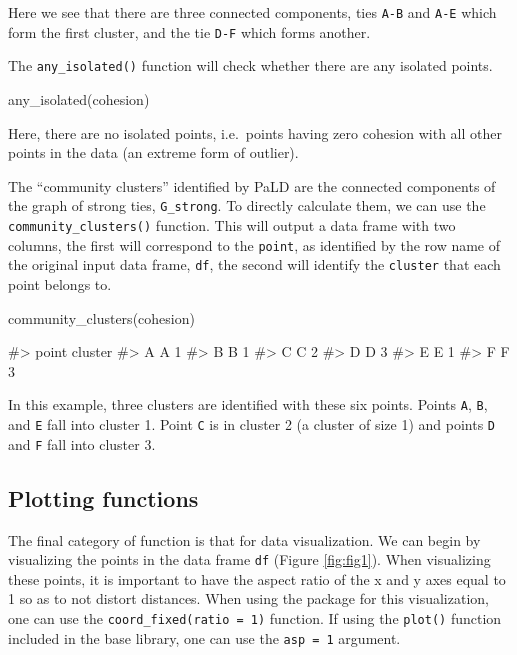 Here we see that there are three connected components, ties \texttt{A-B}
and \texttt{A-E} which form the first cluster, and the tie \texttt{D-F}
which forms another.

The \texttt{any\_isolated()} function will check whether there are any
isolated points.

\begin{Schunk}
\begin{Sinput}
any_isolated(cohesion)
\end{Sinput}
\end{Schunk}

\noindent Here, there are no isolated points, i.e.~points having zero
cohesion with all other points in the data (an extreme form of outlier).

The ``community clusters'' identified by PaLD are the connected
components of the graph of strong ties, \texttt{G\_strong}. To directly
calculate them, we can use the \texttt{community\_clusters()} function.
This will output a data frame with two columns, the first will
correspond to the \texttt{point}, as identified by the row name of the
original input data frame, \texttt{df}, the second will identify the
\texttt{cluster} that each point belongs to.

\begin{Schunk}
\begin{Sinput}
community_clusters(cohesion)
\end{Sinput}
\begin{Soutput}
#>   point cluster
#> A     A       1
#> B     B       1
#> C     C       2
#> D     D       3
#> E     E       1
#> F     F       3
\end{Soutput}
\end{Schunk}

In this example, three clusters are identified with these six points.
Points \texttt{A}, \texttt{B}, and \texttt{E} fall into cluster 1. Point
\texttt{C} is in cluster 2 (a cluster of size 1) and points \texttt{D}
and \texttt{F} fall into cluster 3.

\hypertarget{plotting-functions}{%
\subsection{Plotting functions}\label{plotting-functions}}

The final category of function is that for data visualization. We can
begin by visualizing the points in the data frame \texttt{df} (Figure
\ref{fig:fig1}). When visualizing these points, it is important to have
the aspect ratio of the x and y axes equal to 1 so as to not distort
distances. When using the  package for this
visualization, one can use the \texttt{coord\_fixed(ratio\ =\ 1)}
function. If using the \texttt{plot()} function included in the base
library, one can use the \texttt{asp\ =\ 1} argument.

